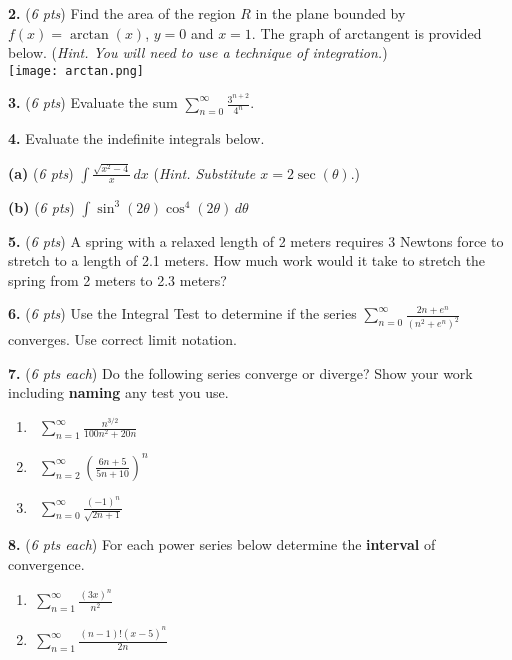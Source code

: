 \documentclass[12pt]{article}
\renewcommand{\emph}[1]{\textsf{\textbf{#1}}}
\newcommand{\prob}[1]{\bigskip\noindent\textbf{#1.} }
\newcommand{\pts}[1]{{\small (\textsl{#1})}}
\newcommand{\probpts}[2]{\prob{#1} \pts{#2 pts} \quad}
\newcommand{\epartpts}[2]{\medskip\noindent \textbf{(#1)} \pts{#2 pts} \quad}
\begin{document}
\newpage
\probpts{2}{6}  Find the area of the region $R$ in the plane bounded by $f(x)=\arctan(x)$, $y=0$ and $x=1.$ The graph of arctangent is provided below.  (\textsl{Hint. You will need to use a technique of integration.}) \\

\texttt{[image: arctan.png]}
\vspace{2.0in}

\probpts{3}{6} Evaluate the sum $\displaystyle \sum_{n=0}^\infty \frac{3^{n+2}}{4^{n}}$.
\vfill


\newpage
\prob{4}  Evaluate the indefinite integrals below.

\epartpts{a}{6} $\displaystyle{\int \frac{\sqrt{x^2-4}}{x} \, dx}$ \hfill (\textsl{Hint. Substitute $x=2 \sec(\theta).$})
\vfill

\epartpts{b}{6} $\displaystyle{\int \sin^3(2\theta)\cos^4(2\theta) \, d\theta}$
\vfill

\newpage
\probpts{5}{6}  %
A spring with a relaxed length of 2 meters requires 3 Newtons force to stretch to a length of 2.1 meters.  How much work would it take to stretch the spring from 2 meters to 2.3 meters?
\vfill

\probpts{6}{6}  Use the  Integral Test to determine if the series $\displaystyle \sum_{n=0}^\infty \frac{2n+e^n}{(n^2+e^n)^2}$ converges. Use correct limit notation.
\vfill

\newpage
\prob{7} \pts{6 pts each} \quad Do the following series converge or diverge? Show your work including \textbf{naming} any test you use.

\renewcommand{\labelenumi}{\textbf{(\alph{enumi})}}
	\begin{enumerate}[leftmargin=7mm]
	\item \, $\displaystyle{\sum_{n=1}^\infty \frac{n^{3/2}}{100n^2+20n}}$
	\vfill
	\item \, $\displaystyle{\sum_{n=2}^\infty \left(\frac{6n+5}{5n+10}\right)^n}$
	\vfill
	\item \, $\displaystyle{\sum_{n=0}^\infty \frac{(-1)^n}{\sqrt{2n+1}}}$
	\vfill
	\end{enumerate}

\newpage
\prob{8} \pts{6 pts each} \quad For each power series below determine the \emph{interval} of convergence.
	\begin{enumerate}[leftmargin=7mm]
	\item \,$\displaystyle \sum_{n=1}^\infty \frac{(3x)^n}{n^2}$
	\vfill
	\item \,$\displaystyle \sum_{n=1}^\infty \frac{(n-1)!(x-5)^n}{2n}$
	\vfill
	\end{enumerate}
\end{document}
